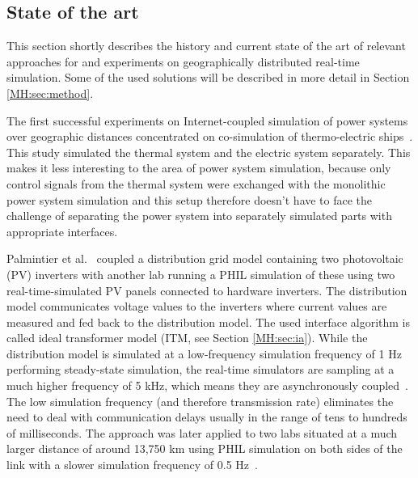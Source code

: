 \documentclass[a4paper]{atseminar}
\begin{document}
\subsection{State of the art}
\label{MH:sec:art}

This section shortly describes the history and current state of the art of relevant approaches for and experiments on geographically distributed real-time simulation. Some of the used solutions will be described in more detail in Section \ref{MH:sec:method}.



The first successful experiments on Internet-coupled simulation of power systems over geographic distances concentrated on co-simulation of thermo-electric ships~\cite{faruque2009a, faruque2009b}. This study simulated the thermal system and the electric system separately. This makes it less interesting to the area of power system simulation, because only control signals from the thermal system were exchanged with the monolithic power system simulation and this setup therefore
doesn't have to face the challenge of separating the power system into separately simulated parts with appropriate interfaces.


Palmintier et al.~\cite{palmintier2015} coupled a distribution grid model containing two photovoltaic (PV) inverters with another lab running a PHIL simulation of these using two real-time-simulated PV panels connected to hardware inverters. The distribution model communicates voltage values to the inverters where current values are measured and fed back to the distribution model. The used interface algorithm is called ideal transformer model (ITM, see Section \ref{MH:sec:ia}).
While the distribution model is simulated at a low-frequency simulation frequency of 1 Hz performing steady-state simulation, the real-time simulators are sampling at a much higher frequency of 5 kHz, which means they are asynchronously coupled~\cite{syed2020standard}. The low simulation frequency (and therefore transmission rate) eliminates the need to deal with communication delays usually in the range of tens to hundreds of milliseconds.
The approach was later applied to two labs situated at a much larger distance of around 13,750 km using PHIL simulation on both sides of the link with a slower simulation frequency of 0.5 Hz~\cite{lundstrom2017}.
\end{document}

